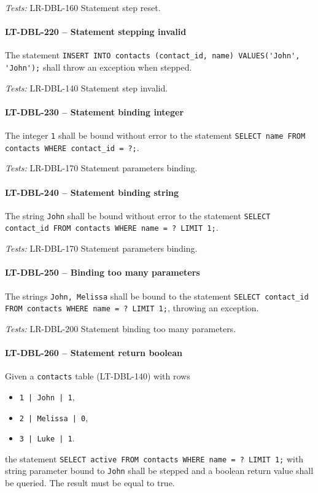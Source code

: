\textit{Tests: } LR-DBL-160 Statement step reset.

\paragraph{LT-DBL-220 -- Statement stepping invalid}
The statement \lstinline{INSERT INTO contacts (contact_id, name) VALUES('John', 'John');}
shall throw an exception when stepped.

\textit{Tests: } LR-DBL-140 Statement step invalid.

\paragraph{LT-DBL-230 -- Statement binding integer}
The integer \lstinline{1} shall be bound without error to the statement
\lstinline{SELECT name FROM contacts WHERE contact_id = ?;}.

\textit{Tests: } LR-DBL-170 Statement parameters binding.

\paragraph{LT-DBL-240 -- Statement binding string}
The string \lstinline{John} shall be bound without error to the statement
\lstinline{SELECT contact_id FROM contacts WHERE name = ? LIMIT 1;}.

\textit{Tests: } LR-DBL-170 Statement parameters binding.

\paragraph{LT-DBL-250 -- Binding too many parameters}
The strings \lstinline{John, Melissa} shall be bound to the statement
\lstinline{SELECT contact_id FROM contacts WHERE name = ? LIMIT 1;},
throwing an exception.

\textit{Tests: } LR-DBL-200 Statement binding too many parameters.

\paragraph{LT-DBL-260 -- Statement return boolean}
Given a \lstinline{contacts} table (LT-DBL-140)
with rows
\begin{itemize}
\item \lstinline{1 | John | 1},
\item \lstinline{2 | Melissa | 0},
\item \lstinline{3 | Luke | 1}.
\end{itemize}
the statement \lstinline{SELECT active FROM contacts WHERE name = ? LIMIT 1;}
with string parameter bound to \lstinline{John} shall be stepped and
a boolean return value shall be queried. The result must be equal to true.

